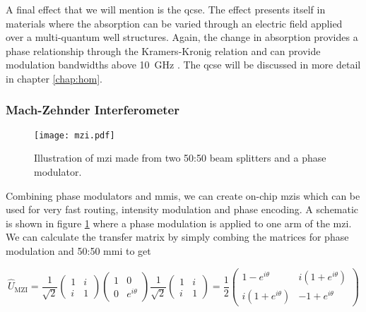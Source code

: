 A final effect that we will mention is the \ac{qcse}. The effect presents itself in materials where the absorption can be varied through an electric field applied over a multi-quantum well structures. Again, the change in absorption provides a phase relationship through the Kramers-Kronig relation and can provide modulation bandwidths above \SI{10}{GHz} \cite{Sibson2017InP, semenenko2019integrated, semenenko2019mdi, semenenko2019, smit2014}. The \ac{qcse} will be discussed in more detail in chapter \ref{chap:hom}.

\subsubsection*{Mach-Zehnder Interferometer}

\begin{figure}[t]
	\centering
	\texttt{[image: mzi.pdf]}
	\caption[Mach-Zehnder interferometer schematic]{Illustration of \acs{mzi} made from two 50:50 beam splitters and a phase modulator.}
	\label{fig:mzi}
\end{figure}

Combining phase modulators and \acp{mmi}, we can create on-chip \acp{mzi} which can be used for very fast routing, intensity modulation and phase encoding. A schematic is shown in figure \ref{fig:mzi} where a phase modulation is applied to one arm of the \ac{mzi}.  We can calculate the transfer matrix by simply combing the matrices for phase modulation and {50:50} \ac{mmi} to get

\begin{equation}
	\hat{U}_\mathrm{MZI} = \frac{1}{\sqrt{2}}\left(
	\begin{matrix}
	1 & i\\
	i & 1
	\end{matrix}
	\right)
	\left(
	\begin{matrix}
	1 & 0\\
	0 & e^{i\theta}
	\end{matrix}
	\right)
	\frac{1}{\sqrt{2}}\left(
	\begin{matrix}
	1 & i\\
	i & 1
	\end{matrix}
	\right)=
	\frac{1}{2}\left(
	\begin{matrix}
	1 - e^{i\theta} & i(1 +  e^{i\theta})\\
	i(1 +  e^{i\theta}) & -1 +  e^{i\theta}
	\end{matrix}
	\right)
\end{equation}

